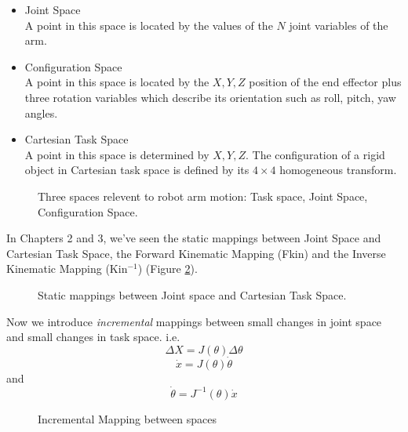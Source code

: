 \begin{itemize}
\item Joint Space\\
A point in this space is located by the values of the $N$ joint variables of the arm.
\item Configuration Space\\
A point in this space is located by the $X,Y,Z$ position of the end effector plus three rotation variables which describe its orientation such as roll, pitch, yaw angles.
\item Cartesian Task Space\\
A point in this space is determined by $X,Y,Z$.  The configuration of a rigid object in Cartesian task space is defined by its $4\times4$ homogeneous transform.
\end{itemize}



\begin{figure}[h]
\centering
{}
\caption{Three spaces relevent to robot arm motion: Task space, Joint Space, Configuration Space.}\label{Spaces}
\end{figure}

In Chapters 2 and 3, we've seen the static mappings between Joint Space and Cartesian Task Space,  the Forward Kinematic
Mapping (Fkin) and the Inverse Kinematic Mapping (Kin$^{-1}$) (Figure \ref{Static}).

\begin{figure}[h]
\centering
{}
\caption{Static mappings between Joint space and Cartesian Task Space.}\label{Static}
\end{figure}

Now we introduce {\it incremental} mappings between small changes in joint space and small changes
in task space. i.e.
\[
\Delta X = J(\theta)\Delta \theta
\]
\[
\dot{x} = J(\theta)\dot{\theta}
\]
and
\[
\dot{\theta} = J^{-1}(\theta)\dot{x}
\]


\begin{figure}[h]
\centering
{}
\caption{Incremental Mapping between spaces}\label{IncSpaces}
\end{figure}


